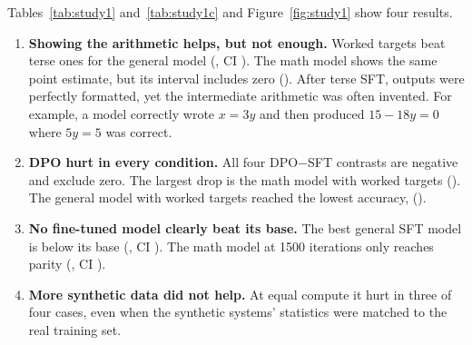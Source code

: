 \documentclass[11pt,a4paper]{article}
\begin{document}
Tables~\ref{tab:study1} and~\ref{tab:study1c} and Figure~\ref{fig:study1} show four
results.
\begin{enumerate}
  \item \textbf{Showing the arithmetic helps, but not enough.} Worked targets beat terse ones
        for the general model (\numFormatDiffGen{}, CI \numFormatCIGen{}). The math model
        shows the same point estimate, but its interval includes zero (\numFormatCIMath{}).
        After terse SFT, outputs were perfectly formatted, yet the intermediate arithmetic was
        often invented. For example, a model correctly wrote $x=3y$ and then produced
        $15-18y=0$ where $5y=5$ was correct.
  \item \textbf{DPO hurt in every condition.} All four DPO$-$SFT contrasts are negative and
        exclude zero. The largest drop is the math model with worked targets
        (\numDpoWorkedDiffMath{}). The general model with worked targets reached the
        lowest accuracy, \numWorkedDPOGen{} (\numDpoWorkedDiffGen{}).
  \item \textbf{No fine-tuned model clearly beat its base.} The best general SFT model is
        below its base (\numBestMinusBaseGen{}, CI \numBestMinusBaseCIGen{}). The math model
        at 1500 iterations only reaches parity (\numBestMinusBaseMath{}, CI
        \numBestMinusBaseCIMath{}).
  \item \textbf{More synthetic data did not help.} At equal compute it hurt in three of four
        cases, even when the synthetic systems' statistics were matched to the real
        training set.
\end{enumerate}
\end{document}

